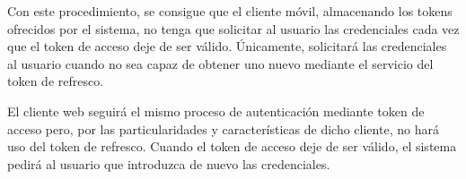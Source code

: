 Con este procedimiento, se consigue que el cliente móvil, almacenando los tokens ofrecidos por el sistema, no tenga que solicitar al usuario las credenciales cada vez que el token de acceso deje de ser válido. Únicamente, solicitará las credenciales al usuario cuando no sea capaz de obtener uno nuevo mediante el servicio del token de refresco.

El cliente web seguirá el mismo proceso de autenticación mediante token de acceso pero, por las particularidades y características de dicho cliente, no hará uso del token de refresco. Cuando el token de acceso deje de ser válido, el sistema pedirá al usuario que introduzca de nuevo las credenciales.





